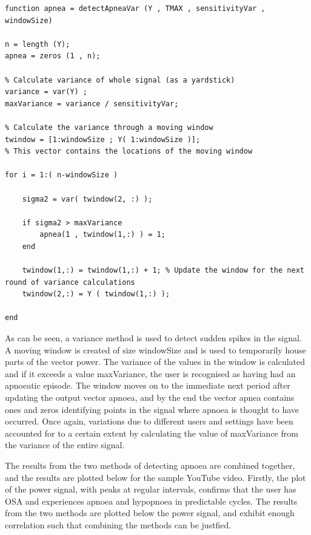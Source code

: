 \begin{lstlisting}
function apnea = detectApneaVar (Y , TMAX , sensitivityVar , windowSize)

n = length (Y);
apnea = zeros (1 , n);

% Calculate variance of whole signal (as a yardstick)
variance = var(Y) ;
maxVariance = variance / sensitivityVar;

% Calculate the variance through a moving window
twindow = [1:windowSize ; Y( 1:windowSize )];
% This vector contains the locations of the moving window

for i = 1:( n-windowSize )

    sigma2 = var( twindow(2, :) );
    
    if sigma2 > maxVariance 
        apnea(1 , twindow(1,:) ) = 1;
    end
    
    twindow(1,:) = twindow(1,:) + 1; % Update the window for the next round of variance calculations
    twindow(2,:) = Y ( twindow(1,:) );

end
\end{lstlisting}

As can be seen, a variance method is used to detect sudden spikes in the signal. A moving window is created of size windowSize and is used to temporarily house parts of the vector power. The variance of the values in the window is calculated and if it exceeds a value maxVariance, the user is recognised as having had an apnoeatic episode. The window moves on to the immediate next period after updating the output vector apnoea, and by the end the vector apnea contains ones and zeros identifying points in the signal where apnoea is thought to have occurred. Once again, variations due to different users and settings have been accounted for to a certain extent by calculating the value of maxVariance from the variance of the entire signal.

The results from the two methods of detecting apnoea are combined together, and the results are plotted below for the sample YouTube video. Firstly, the plot of the power signal, with peaks at regular intervals, confirms that the user has OSA and experiences apnoea and hypopnoea in predictable cycles. The results from the two methods are plotted below the power signal, and exhibit enough correlation such that combining the methods can be justfied. 

